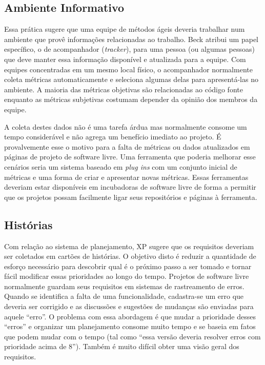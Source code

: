 \subsection{Ambiente Informativo}
\label{subsec:inform-worksp}

Essa prática sugere que uma equipe de métodos ágeis deveria trabalhar
num ambiente que provê informações relacionadas ao trabalho. Beck
\cite{XP01} atribui um papel específico, o de acompanhador
(\emph{tracker}), para uma pessoa (ou algumas pessoas) que deve manter
essa informação disponível e atualizada para a equipe. Com equipes
concentradas em um mesmo local físico, o acompanhador normalmente
coleta métricas \cite{Sato2007} automaticamente e seleciona algumas
delas para apresentá-las no ambiente. A maioria das métricas objetivas
são relacionadas ao código fonte enquanto as métricas subjetivas
costumam depender da opinião dos membros da equipe.

A coleta destes dados não é uma tarefa árdua mas normalmente consome
um tempo considerável e não agrega um benefício imediato ao projeto. É
provalvemente esse o motivo para a falta de métricas ou dados
atualizados em páginas de projeto de software livre. Uma ferramenta
que poderia melhorar esse cenários seria um sistema baseado em
\emph{plug ins} com um conjunto inicial de métricas e uma forma de
criar e apresentar novas métricas. Essas ferramentas deveriam estar
disponíveis em incubadoras de software livre de forma a permitir que
os projetos possam facilmente ligar seus repositórios e páginas à
ferramenta.

\subsection{Histórias}
\label{subsec:stories}

Com relação ao sistema de planejamento, XP sugere que os requisitos
deveriam ser coletados em cartões de histórias. O objetivo disto é
reduzir a quantidade de esforço necessário para descobrir qual é o
próximo passo a ser tomado e tornar fácil modificar essas prioridades
ao longo do tempo. Projetos de software livre normalmente guardam seus
requisitos em sistemas de rastreamento de erros. Quando se identifica
a falta de uma funcionalidade, cadastra-se um erro que deveria ser
corrigido e as discussões e sugestões de mudanças são enviadas para
aquele ``erro''. O problema com essa abordagem é que mudar a
prioridade desses ``erros'' e organizar um planejamento consome muito
tempo e se baseia em fatos que podem mudar com o tempo (tal como
``essa versão deveria resolver erros com prioridade acima de
8''). Também é muito difícil obter uma visão geral dos requisitos.

